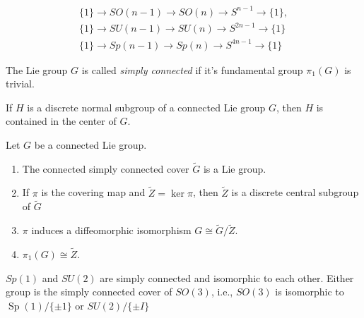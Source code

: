 \documentclass[11pt]{homework}
\begin{document}
\begin{remark}
    \begin{align*}
        \{1\} \rightarrow SO(n-1) \rightarrow SO(n) \rightarrow S^{n-1} \rightarrow \{1\},\\
        \{1\} \rightarrow SU(n-1) \rightarrow SU(n) \rightarrow S^{2n-1} \rightarrow \{1\}\\
        \{1\} \rightarrow Sp(n-1) \rightarrow Sp(n) \rightarrow S^{4n-1} \rightarrow \{1\}
    \end{align*}
\end{remark}

\begin{definition}
    The Lie group $G$ is called \textit{simply connected} if it's fundamental group $\pi_1 (G)$ is trivial.
\end{definition}

\begin{lemma}
    If $H$ is a discrete normal subgroup of a connected Lie group $G$, then $H$ is contained in the center of $G$.
\end{lemma}

\begin{theorem}
    Let $G$ be a connected Lie group.
    \begin{enumerate}
        \item The connected simply connected cover $\widetilde{G}$ is a Lie group.
        \item If $\pi$ is the covering map and $\widetilde{Z}=\operatorname{ker} \pi$, then $\widetilde{Z}$ is a discrete central subgroup of $\widetilde{G}$
        \item $\pi$ induces a diffeomorphic isomorphism $G \cong \widetilde{G} / \widetilde{Z}$.
        \item $\pi_{1}(G) \cong \widetilde{Z}$.
    \end{enumerate}
\end{theorem}

\begin{lemma}
    $Sp(1)$ and $SU(2)$ are simply connected and isomorphic to each other. Either group is the simply connected cover of $S O(3)$, i.e., $S O(3)$ is isomorphic to $\operatorname{Sp}(1) /\{\pm 1\}$ or $S U(2) /\{\pm I\}$
\end{lemma}
\end{document}
